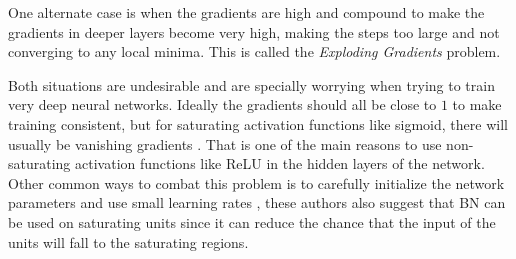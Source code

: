 One alternate case is when the gradients are high and compound to make the gradients in deeper layers become very high, making the steps too large and not converging to any local minima. This is called the \textit{Exploding Gradients} problem.

Both situations are undesirable and are specially worrying when trying to train very deep neural networks. Ideally the gradients should all be close to $1$ to make training consistent, but for saturating activation functions like sigmoid, there will usually be vanishing gradients \cite{NN&DL2015}. That is one of the main reasons to use non-saturating activation functions like \gls{ReLU} in the hidden layers of the network. Other common ways to combat this problem is to carefully initialize the network parameters and use small learning rates \cite{batchnorm2015}, these authors also suggest that \gls{BN} can be used on saturating units since it can reduce the chance that the input of the units will fall to the saturating regions.

